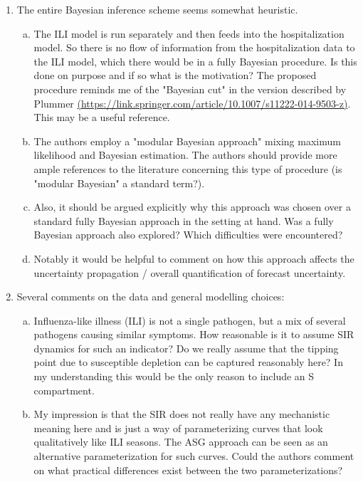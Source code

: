 \documentclass{article}
\begin{document}
\begin{enumerate}[1.]
\item The entire Bayesian inference scheme seems somewhat heuristic.

\begin{enumerate}[a.]
\item The ILI model is run separately and then feeds into the hospitalization model. So there is no
flow of information from the hospitalization data to the ILI model, which there would be in a fully
Bayesian procedure. Is this done on purpose and if so what is the motivation? The proposed
procedure reminds me of the "Bayesian cut" in the version described by Plummer
\href{(https://link.springer.com/article/10.1007/s11222-014-9503-z)}{(https://link.springer.com/article/10.1007/s11222-014-9503-z)}.
This may be a useful reference.
\item The authors employ a "modular Bayesian approach" mixing maximum likelihood and
Bayesian estimation. The authors should provide more ample references to the literature concerning
this type of procedure (is "modular Bayesian" a standard term?).
\item Also, it should be argued explicitly why this approach was chosen over a standard fully
Bayesian approach in the setting at hand. Was a fully Bayesian approach also explored? Which
difficulties were encountered?
\item Notably it would be helpful to comment on how this approach affects the uncertainty
propagation / overall quantification of forecast uncertainty.

\end{enumerate}


\item Several comments on the data and general modelling choices:

\begin{enumerate}[a.]
\item Influenza-like illness (ILI) is not a single pathogen, but a mix of several pathogens causing
similar symptoms. How reasonable is it to assume SIR dynamics for such an indicator? Do we
really assume that the tipping point due to susceptible depletion can be captured reasonably here? In
my understanding this would be the only reason to include an S compartment.

\item My impression is that the SIR does not really have any mechanistic meaning here and is just a
way of parameterizing curves that look qualitatively like ILI seasons. The ASG approach can be
seen as an alternative parameterization for such curves. Could the authors comment on what
practical differences exist between the two parameterizations?


\end{enumerate}
\end{enumerate}
\end{document}
